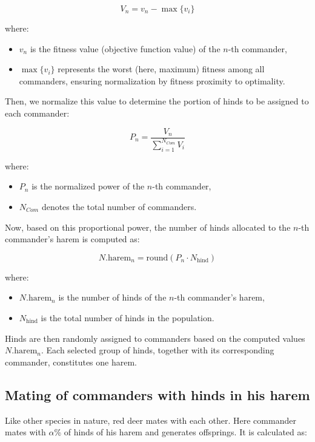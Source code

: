 \documentclass[pdflatex,sn-mathphys-num]{sn-jnl}%
\theoremstyle{thmstyleone}%
\theoremstyle{thmstyletwo}%
\theoremstyle{thmstylethree}%
\begin{document}
\begin{equation}
V_n = v_n - \max\{v_i\}
\end{equation}

\noindent where:
\begin{itemize}
    \item \( v_n \) is the fitness value (objective function value) of the \( n \)-th commander,
    \item \( \max\{v_i\} \) represents the worst (here, maximum) fitness among all commanders, ensuring normalization by fitness proximity to optimality.
\end{itemize}

Then, we normalize this value to determine the portion of hinds to be assigned to each commander:

\begin{equation}
P_n = \frac{V_n}{\sum_{i=1}^{N_{Com}} V_i}
\end{equation}

\noindent where:
\begin{itemize}
    \item \( P_n \) is the normalized power of the \( n \)-th commander,
    \item \( N_{Com} \) denotes the total number of commanders.
\end{itemize}

Now, based on this proportional power, the number of hinds allocated to the \( n \)-th commander’s harem is computed as:

\begin{equation}
N.{\text{harem}_n} = \text{round}(P_n \cdot N_{\text{hind}})
\end{equation}

\noindent where:
\begin{itemize}
    \item \( N.{\text{harem}_n} \) is the number of hinds of the \( n \)-th commander's harem,
    \item \( N_{\text{hind}} \) is the total number of hinds in the population.
\end{itemize}

Hinds are then randomly assigned to commanders based on the computed values \( N.{\text{harem}_n} \). Each selected group of hinds, together with its corresponding commander, constitutes one harem.

\subsection{Mating of commanders with hinds in his harem}\label{subsec4.6}
Like other species in nature, red deer mates with each other. Here commander mates with $\alpha$\%  of hinds of his harem and generates offsprings. It is calculated as:
\end{document}
